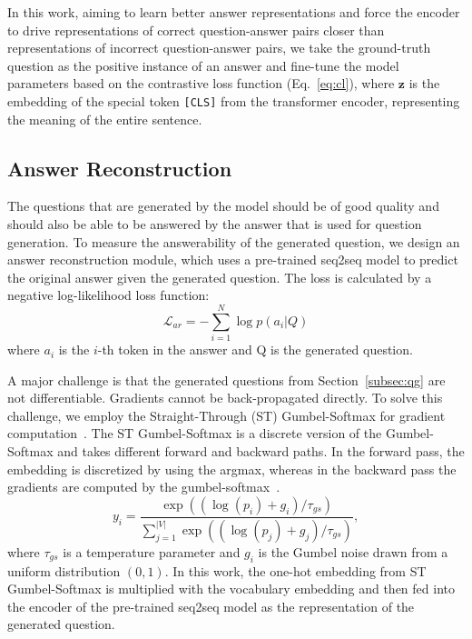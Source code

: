 \documentclass[11pt]{article}
\begin{document}
In this work, aiming to learn better answer representations and force the encoder to drive representations of correct question-answer pairs closer than representations of incorrect question-answer pairs, we take the ground-truth question as the positive instance of an answer and fine-tune the model parameters based on the contrastive loss function (Eq.~\ref{eq:cl}), where $\textbf{z}$ is the embedding of the special token \texttt{[CLS]} from the transformer encoder, representing the meaning of the entire sentence.


\subsection{Answer Reconstruction}
\label{subsec:ar}

The questions that are generated by the model should be of good quality and should also be able to be answered by the answer that is used for question generation. To measure the answerability of the generated question, we design an answer reconstruction module, which uses a pre-trained seq2seq model to predict the original answer given the generated question. The loss is calculated by a negative log-likelihood loss function: 
\begin{equation}\label{eq:ar}
    \mathcal{L}_{ar}=-\sum_{i=1}^{N}\log p(a_{i}|Q)
\end{equation}
where $a_{i}$ is the $i$-th token in the answer and Q is the generated question.

A major challenge is that the generated questions from Section~\ref{subsec:qg} are not differentiable.
Gradients cannot be back-propagated directly.
To solve this challenge, we employ the Straight-Through (ST) Gumbel-Softmax for gradient computation~\cite{jang-etal-2017-categorical}.
The ST Gumbel-Softmax is a discrete version of the Gumbel-Softmax and takes different forward and backward paths. In the forward pass, the embedding is discretized by using the argmax, whereas in the backward pass the gradients are computed by the gumbel-softmax~\cite{qader-etal-2019-semi,lu2021weakly}. 
\begin{equation}
    y_{i} = \frac{\exp((\log(p_{i})+g_{i})/\tau_{gs})}{\sum_{j=1}^{|V|}\exp((\log(p_{j})+g_{j})/\tau_{gs})},
\end{equation}
where $\tau_{gs}$ is a temperature parameter and $g_{i}$ is the Gumbel noise drawn from a uniform distribution $(0,1)$. 
In this work, the one-hot embedding from ST Gumbel-Softmax is multiplied with the vocabulary embedding and then fed into the encoder of the pre-trained seq2seq model as the representation of the generated question.
\end{document}
